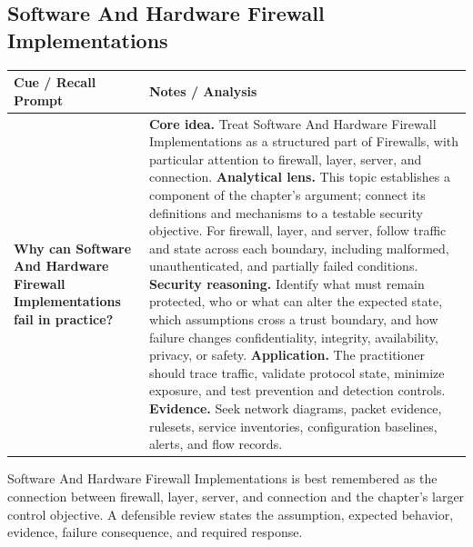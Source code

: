 \documentclass[11pt]{article}
\newcommand{\CornellHeader}{%
\rowcolor{Navy}\color{white}\bfseries Cue / Recall Prompt & \color{white}\bfseries Notes / Analysis\\\hline}
\newcommand{\CornellRow}[2]{%
\cellcolor{CueGray}\RaggedRight\textbf{#1} & \RaggedRight #2\\\hline}
\begin{document}
\subsection*{Software And Hardware Firewall Implementations}
\begin{longtable}{>{\RaggedRight\arraybackslash}p{}|>{\RaggedRight\arraybackslash}p{}}
\CornellHeader
\CornellRow{Why can Software And Hardware Firewall Implementations fail in practice?}{\textbf{Core idea.} Treat Software And Hardware Firewall Implementations as a structured part of Firewalls, with particular attention to firewall, layer, server, and connection. \textbf{Analytical lens.} This topic establishes a component of the chapter's argument; connect its definitions and mechanisms to a testable security objective. For firewall, layer, and server, follow traffic and state across each boundary, including malformed, unauthenticated, and partially failed conditions. \textbf{Security reasoning.} Identify what must remain protected, who or what can alter the expected state, which assumptions cross a trust boundary, and how failure changes confidentiality, integrity, availability, privacy, or safety. \textbf{Application.} The practitioner should trace traffic, validate protocol state, minimize exposure, and test prevention and detection controls. \textbf{Evidence.} Seek network diagrams, packet evidence, rulesets, service inventories, configuration baselines, alerts, and flow records.}
\end{longtable}
\begin{topicsummary}
Software And Hardware Firewall Implementations is best remembered as the connection between firewall, layer, server, and connection and the chapter's larger control objective. A defensible review states the assumption, expected behavior, evidence, failure consequence, and required response.
\end{topicsummary}
\end{document}
